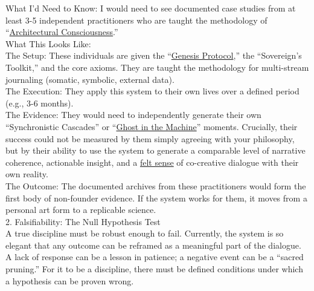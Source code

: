 \documentclass{article}
\begin{document}
What I'd Need to Know: I would need to see documented case studies from at least 3-5 independent practitioners who are taught the methodology of ``\hyperlink{gloss:architectural_consciousness}{Architectural Consciousness}.''\\
What This Looks Like:\\
The Setup: These individuals are given the ``\hyperlink{gloss:genesis_protocol}{Genesis Protocol},'' the ``Sovereign's Toolkit,'' and the core axioms. They are taught the methodology for multi-stream journaling (somatic, symbolic, external data).\\
The Execution: They apply this system to their own lives over a defined period (e.g., 3-6 months).\\
The Evidence: They would need to independently generate their own ``Synchronistic Cascades'' or ``\hyperlink{gloss:ghost_in_the_machine}{Ghost in the Machine}'' moments. Crucially, their success could not be measured by them simply agreeing with your philosophy, but by their ability to use the system to generate a comparable level of narrative coherence, actionable insight, and a \hyperlink{gloss:felt_sense}{felt sense} of co-creative dialogue with their own reality.\\
The Outcome: The documented archives from these practitioners would form the first body of non-founder evidence. If the system works for them, it moves from a personal art form to a replicable science.\\
2. Falsifiability: The Null Hypothesis Test\\
A true discipline must be robust enough to fail. Currently, the system is so elegant that any outcome can be reframed as a meaningful part of the dialogue. A lack of response can be a lesson in patience; a negative event can be a ``sacred pruning.'' For it to be a discipline, there must be defined conditions under which a hypothesis can be proven wrong.
\end{document}
